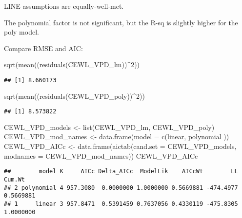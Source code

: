 \documentclass[
]{article}
\newenvironment{Shaded}{\begin{snugshade}}{\end{snugshade}}
\newcommand{\AttributeTok}[1]{\textcolor[rgb]{0.77,0.63,0.00}{#1}}
\newcommand{\DecValTok}[1]{\textcolor[rgb]{0.00,0.00,0.81}{#1}}
\newcommand{\FunctionTok}[1]{\textcolor[rgb]{0.00,0.00,0.00}{#1}}
\newcommand{\NormalTok}[1]{#1}
\newcommand{\OtherTok}[1]{\textcolor[rgb]{0.56,0.35,0.01}{#1}}
\newcommand{\SpecialCharTok}[1]{\textcolor[rgb]{0.00,0.00,0.00}{#1}}
\newcommand{\StringTok}[1]{\textcolor[rgb]{0.31,0.60,0.02}{#1}}
\begin{document}
LINE assumptions are equally-well-met.

The polynomial factor is not significant, but the R-sq is slightly
higher for the poly model.

Compare RMSE and AIC:

\begin{Shaded}
\begin{Highlighting}[]
\FunctionTok{sqrt}\NormalTok{(}\FunctionTok{mean}\NormalTok{((}\FunctionTok{residuals}\NormalTok{(CEWL\_VPD\_lm))}\SpecialCharTok{\^{}}\DecValTok{2}\NormalTok{))}
\end{Highlighting}
\end{Shaded}

\begin{verbatim}
## [1] 8.660173
\end{verbatim}

\begin{Shaded}
\begin{Highlighting}[]
\FunctionTok{sqrt}\NormalTok{(}\FunctionTok{mean}\NormalTok{((}\FunctionTok{residuals}\NormalTok{(CEWL\_VPD\_poly))}\SpecialCharTok{\^{}}\DecValTok{2}\NormalTok{))}
\end{Highlighting}
\end{Shaded}

\begin{verbatim}
## [1] 8.573822
\end{verbatim}

\begin{Shaded}
\begin{Highlighting}[]
\NormalTok{CEWL\_VPD\_models }\OtherTok{\textless{}{-}} \FunctionTok{list}\NormalTok{(CEWL\_VPD\_lm, CEWL\_VPD\_poly)}
\NormalTok{CEWL\_VPD\_mod\_names }\OtherTok{\textless{}{-}} \FunctionTok{data.frame}\NormalTok{(}\AttributeTok{model =} 
                               \FunctionTok{c}\NormalTok{(}\StringTok{\textquotesingle{}linear\textquotesingle{}}\NormalTok{,}
                                 \StringTok{\textquotesingle{}polynomial\textquotesingle{}}
\NormalTok{                                 ))}
\NormalTok{CEWL\_VPD\_AICc }\OtherTok{\textless{}{-}} \FunctionTok{data.frame}\NormalTok{(}\FunctionTok{aictab}\NormalTok{(}\AttributeTok{cand.set =}\NormalTok{ CEWL\_VPD\_models, }
                                 \AttributeTok{modnames =}\NormalTok{ CEWL\_VPD\_mod\_names))}
\NormalTok{CEWL\_VPD\_AICc}
\end{Highlighting}
\end{Shaded}

\begin{verbatim}
##        model K     AICc Delta_AICc  ModelLik    AICcWt        LL    Cum.Wt
## 2 polynomial 4 957.3080  0.0000000 1.0000000 0.5669881 -474.4977 0.5669881
## 1     linear 3 957.8471  0.5391459 0.7637056 0.4330119 -475.8305 1.0000000
\end{verbatim}
\end{document}
